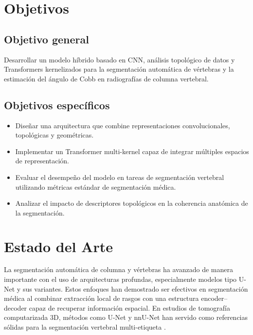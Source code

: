 \documentclass[conference]{IEEEtran}
\begin{document}
\section{Objetivos}

\subsection{Objetivo general}

Desarrollar un modelo híbrido basado en CNN, análisis topológico de datos y Transformers kernelizados para la segmentación automática de vértebras y la estimación del ángulo de Cobb en radiografías de columna vertebral.

\subsection{Objetivos específicos}

\begin{itemize}

\item Diseñar una arquitectura que combine representaciones convolucionales, topológicas y geométricas.

\item Implementar un Transformer multi-kernel capaz de integrar múltiples espacios de representación.

\item Evaluar el desempeño del modelo en tareas de segmentación vertebral utilizando métricas estándar de segmentación médica.

\item Analizar el impacto de descriptores topológicos en la coherencia anatómica de la segmentación.

\end{itemize}

\section{Estado del Arte}
\label{sec:sota}
La segmentación automática de columna y vértebras ha avanzado de manera importante con el uso de arquitecturas profundas, especialmente modelos tipo U-Net y sus variantes. Estos enfoques han demostrado ser efectivos en segmentación médica al combinar extracción local de rasgos con una estructura encoder--decoder capaz de recuperar información espacial. En estudios de tomografía computarizada 3D, métodos como U-Net y nnU-Net han servido como referencias sólidas para la segmentación vertebral multi-etiqueta \cite{ronneberger2015unet,isensee2021nnunet}.
\end{document}
